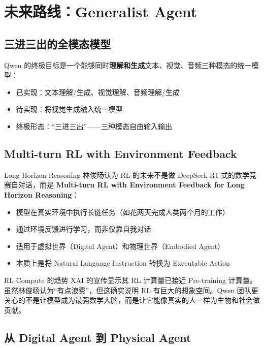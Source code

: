 \documentclass[a4paper]{article}
\begin{document}
\section{未来路线：Generalist Agent}

\subsection{三进三出的全模态模型}

Qwen 的终极目标是一个能够同时\textbf{理解和生成}文本、视觉、音频三种模态的统一模型：

\begin{itemize}
    \item 已实现：文本理解/生成、视觉理解、音频理解/生成
    \item 待实现：将视觉生成融入统一模型
    \item 终极形态：``三进三出''——三种模态自由输入输出
\end{itemize}

\subsection{Multi-turn RL with Environment Feedback}

\begin{importantbox}{Long Horizon Reasoning}
林俊旸认为 RL 的未来不是做 DeepSeek R1 式的数学竞赛自对话，而是 \textbf{Multi-turn RL with Environment Feedback for Long Horizon Reasoning}：
\begin{itemize}
    \item 模型在真实环境中执行长链任务（如花两天完成人类两个月的工作）
    \item 通过环境反馈进行学习，而非仅靠自我对话
    \item 适用于虚拟世界（Digital Agent）和物理世界（Embodied Agent）
    \item 本质上是将 Natural Language Instruction 转换为 Executable Action
\end{itemize}
\end{importantbox}

\begin{knowledgebox}{RL Compute 的趋势}
XAI 的宣传显示其 RL 计算量已接近 Pre-training 计算量。虽然林俊旸认为``有点浪费''，但这确实说明 RL 有巨大的想象空间。Qwen 团队更关心的不是让模型成为最强数学大脑，而是让它能像真实的人一样为生物和社会做贡献。
\end{knowledgebox}

\subsection{从 Digital Agent 到 Physical Agent}
\end{document}
